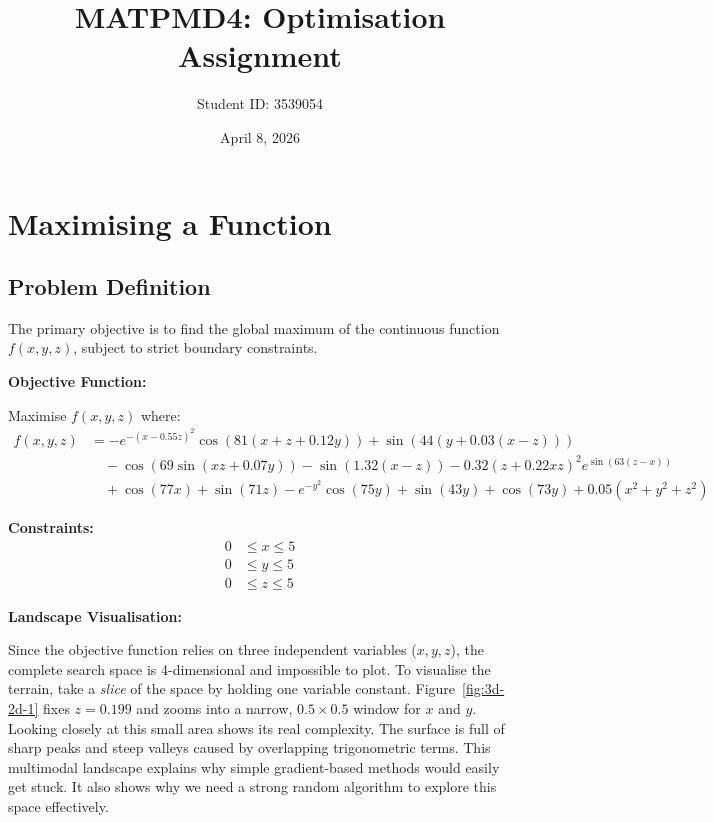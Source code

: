 \documentclass[12pt, a4paper]{article}
\title{
    \Large \textbf{MATPMD4: Optimisation Assignment}
}
\author{Student ID: 3539054}
\date{April 8, 2026}
\begin{document}
\maketitle

\section{Maximising a Function}

\subsection{Problem Definition}

The primary objective is to find the global maximum of the continuous function $f(x, y, z)$, subject to strict boundary constraints.

\vspace{0.5cm}

\hspace{-1.5em}\textbf{Objective Function:}

\vspace{0.25cm}

\hspace{-1.5em}Maximise $f(x, y, z)$ where:
\begin{align*}
f(x, y, z) &= -e^{-(x - 0.55z)^2} \cos(81(x + z + 0.12y)) + \sin(44(y + 0.03(x - z))) \\
&\quad - \cos(69 \sin(xz + 0.07y)) - \sin(1.32(x - z)) - 0.32(z + 0.22xz)^2 e^{\sin(63(z - x))} \\
&\quad + \cos(77x) + \sin(71z) - e^{-y^2} \cos(75y) + \sin(43y) + \cos(73y) + 0.05(x^2 + y^2 + z^2)
\end{align*}

\vspace{0.5cm}

\hspace{-1.5em}\textbf{Constraints:}
\begin{align*}
0 &\le x \le 5 \\
0 &\le y \le 5 \\
0 &\le z \le 5
\end{align*}

\vspace{0.5cm}

\hspace{-1.5em}\textbf{Landscape Visualisation:}

\vspace{0.25cm}

Since the objective function relies on three independent variables ($x, y, z$), the complete search space is 4-dimensional and impossible to plot. To visualise the terrain, take a \textit{slice} of the space by holding one variable constant. Figure~\ref{fig:3d-2d-1} fixes $z = 0.199$ and zooms into a narrow, $0.5 \times 0.5$ window for $x$ and $y$. Looking closely at this small area shows its real complexity. The surface is full of sharp peaks and steep valleys caused by overlapping trigonometric terms. This multimodal landscape explains why simple gradient-based methods would easily get stuck. It also shows why we need a strong random algorithm to explore this space effectively.
\end{document}
